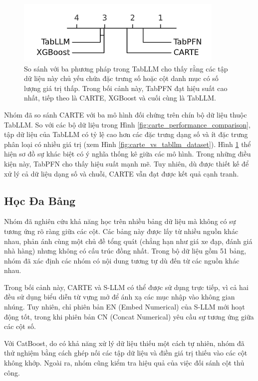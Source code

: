 \documentclass{article}
\begin{document}
\begin{figure} 
    \centering
    \includegraphics[scale = 0.8]{carte_baseline_comparision.png}
    \caption{So sánh với ba phương pháp trong TabLLM cho thấy rằng các tập dữ liệu này chủ yếu chứa đặc trưng số hoặc cột danh mục có số lượng giá trị thấp. Trong bối cảnh này, TabPFN đạt hiệu suất cao nhất, tiếp theo là CARTE, XGBoost và cuối cùng là TabLLM.}
    \label{fig:carte_baseline_comparision}
\end{figure}

Nhóm đã so sánh CARTE với ba mô hình đối chứng trên chín bộ dữ liệu thuộc TabLLM. So với các bộ dữ liệu trong Hình \ref{fig:carte_performance_comparison}, tập dữ liệu của TabLLM có tỷ lệ cao hơn các đặc trưng dạng số và ít đặc trưng phân loại có nhiều giá trị (xem Hình \ref{fig:carte_vs_tabllm_dataset}). Hình \ref{fig:carte_baseline_comparision} thể hiện sơ đồ sự khác biệt có ý nghĩa thống kê giữa các mô hình. Trong những điều kiện này, TabPFN cho thấy hiệu suất mạnh mẽ. Tuy nhiên, dù được thiết kế để xử lý cả dữ liệu dạng số và chuỗi, CARTE vẫn đạt được kết quả cạnh tranh.

\subsection{Học Đa Bảng}
Nhóm đã nghiên cứu khả năng học trên nhiều bảng dữ liệu mà không có sự tương ứng rõ ràng giữa các cột. Các bảng này được lấy từ nhiều nguồn khác nhau, phản ánh cùng một chủ đề tổng quát (chẳng hạn như giá xe đạp, đánh giá nhà hàng) nhưng không có cấu trúc đồng nhất. Trong bộ dữ liệu gồm 51 bảng, nhóm đã xác định các nhóm có nội dung tương tự dù đến từ các nguồn khác nhau.

Trong bối cảnh này, CARTE và S-LLM có thể được sử dụng trực tiếp, vì cả hai đều sử dụng biểu diễn từ vựng mở để ánh xạ các mục nhập vào không gian nhúng. Tuy nhiên, chỉ phiên bản EN (Embed Numerical) của S-LLM mới hoạt động tốt, trong khi phiên bản CN (Concat Numerical) yêu cầu sự tương ứng giữa các cột số.

Với CatBoost, do có khả năng xử lý dữ liệu thiếu một cách tự nhiên, nhóm đã thử nghiệm bằng cách ghép nối các tập dữ liệu và điền giá trị thiếu vào các cột không khớp. Ngoài ra, nhóm cũng kiểm tra hiệu quả của việc đối sánh cột thủ công.
\end{document}
